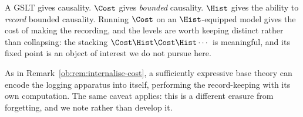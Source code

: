 A GSLT gives causality. $\Cost$ gives \emph{bounded} causality. $\Hist$ gives the ability
to \emph{record} bounded causality. Running $\Cost$ on an $\Hist$-equipped model gives the
cost of making the recording, and the levels are worth keeping distinct rather than
collapsing: the stacking $\Cost\Hist\Cost\Hist\cdots$ is meaningful, and its fixed point
is an object of interest we do not pursue here.

\begin{remark}
As in Remark~\ref{ob:rem:internalise-cost}, a sufficiently expressive base theory can encode
the logging apparatus into itself, performing the record-keeping with its own
computation. The same caveat applies: this is a different erasure from forgetting, and we
note rather than develop it.
\end{remark}
